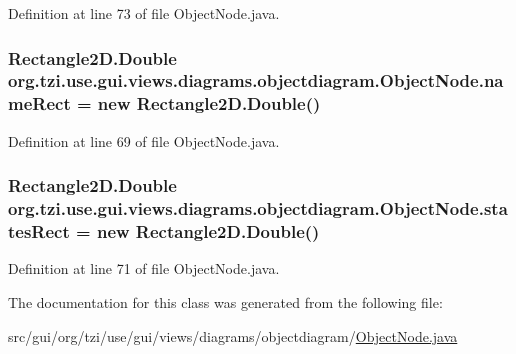 Definition at line 73 of file Object\-Node.\-java.

\hypertarget{classorg_1_1tzi_1_1use_1_1gui_1_1views_1_1diagrams_1_1objectdiagram_1_1_object_node_a74d6845e2f2840bdb58100c0463b6712}{
\subsubsection[{name\-Rect}]{\setlength{\rightskip}{0pt plus 5cm}Rectangle2\-D.\-Double org.\-tzi.\-use.\-gui.\-views.\-diagrams.\-objectdiagram.\-Object\-Node.\-name\-Rect = new Rectangle2\-D.\-Double()\hspace{0.3cm}{\ttfamily [protected]}}}\label{classorg_1_1tzi_1_1use_1_1gui_1_1views_1_1diagrams_1_1objectdiagram_1_1_object_node_a74d6845e2f2840bdb58100c0463b6712}


Definition at line 69 of file Object\-Node.\-java.

\hypertarget{classorg_1_1tzi_1_1use_1_1gui_1_1views_1_1diagrams_1_1objectdiagram_1_1_object_node_abe64f505a16802b36c9cade79ed3a772}{
\subsubsection[{states\-Rect}]{\setlength{\rightskip}{0pt plus 5cm}Rectangle2\-D.\-Double org.\-tzi.\-use.\-gui.\-views.\-diagrams.\-objectdiagram.\-Object\-Node.\-states\-Rect = new Rectangle2\-D.\-Double()\hspace{0.3cm}{\ttfamily [protected]}}}\label{classorg_1_1tzi_1_1use_1_1gui_1_1views_1_1diagrams_1_1objectdiagram_1_1_object_node_abe64f505a16802b36c9cade79ed3a772}


Definition at line 71 of file Object\-Node.\-java.



The documentation for this class was generated from the following file\-:\begin{DoxyCompactItemize}
\item 
src/gui/org/tzi/use/gui/views/diagrams/objectdiagram/\hyperlink{_object_node_8java}{Object\-Node.\-java}\end{DoxyCompactItemize}
